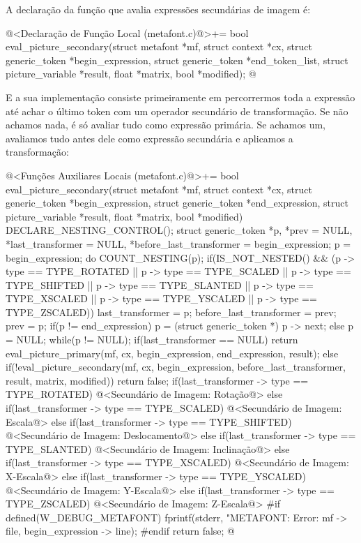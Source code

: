 {A declaração da função que avalia expressões secundárias de imagem é:

\iniciocodigo
@<Declaração de Função Local (metafont.c)@>+=
bool eval_picture_secondary(struct metafont *mf, struct context *cx,
                            struct generic_token *begin_expression,
                            struct generic_token *end_token_list,
                            struct picture_variable *result,
                            float *matrix, bool *modified);
@
\fimcodigo

E a sua implementação consiste primeiramente em percorrermos toda a
expressão até achar o último token com um operador secundário de
transformação. Se não achamos nada, é só avaliar tudo como expressão
primária. Se achamos um, avaliamos tudo antes dele como expressão
secundária e aplicamos a transformação:

\iniciocodigo
@<Funções Auxiliares Locais (metafont.c)@>+=
bool eval_picture_secondary(struct metafont *mf, struct context *cx,
                            struct generic_token *begin_expression,
                            struct generic_token *end_expression,
                            struct picture_variable *result,
                            float *matrix, bool *modified){
  DECLARE_NESTING_CONTROL();
  struct generic_token *p, *prev = NULL, *last_transformer = NULL,
                       *before_last_transformer = begin_expression;
  p = begin_expression;
  do{
    COUNT_NESTING(p);
    if(IS_NOT_NESTED() && (p -> type == TYPE_ROTATED ||
       p -> type == TYPE_SCALED || p -> type == TYPE_SHIFTED ||
       p -> type == TYPE_SLANTED || p -> type == TYPE_XSCALED ||
       p -> type == TYPE_YSCALED || p -> type == TYPE_ZSCALED)){
      last_transformer = p;
      before_last_transformer = prev;
    }
    prev = p;
    if(p != end_expression)
      p = (struct generic_token *) p -> next;
    else
      p = NULL;
  }while(p != NULL);
  if(last_transformer == NULL)
    return eval_picture_primary(mf, cx, begin_expression, end_expression, result);
  else{
    if(!eval_picture_secondary(mf, cx, begin_expression,
                               before_last_transformer, result, matrix, modified))
      return false;
    if(last_transformer -> type == TYPE_ROTATED){
      @<Secundário de Imagem: Rotação@>
    }
    else if(last_transformer -> type == TYPE_SCALED){
      @<Secundário de Imagem: Escala@>
    }
    else if(last_transformer -> type == TYPE_SHIFTED){
      @<Secundário de Imagem: Deslocamento@>
    }
    else if(last_transformer -> type == TYPE_SLANTED){
      @<Secundário de Imagem: Inclinação@>
    }
    else if(last_transformer -> type == TYPE_XSCALED){
      @<Secundário de Imagem: X-Escala@>
    }
    else if(last_transformer -> type == TYPE_YSCALED){
      @<Secundário de Imagem: Y-Escala@>
    }
    else if(last_transformer -> type == TYPE_ZSCALED){
      @<Secundário de Imagem: Z-Escala@>
    }
#if defined(W_DEBUG_METAFONT)
    fprintf(stderr, "METAFONT: Error: %
            mf -> file, begin_expression -> line);
#endif
    return false;
  }
}
@
\fimcodigo

}
